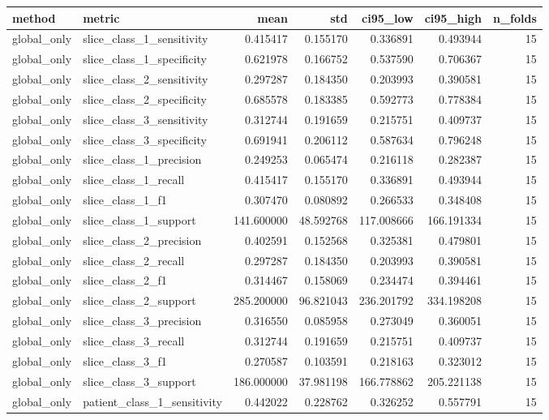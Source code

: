 \begin{tabular}{llrrrrr}
\toprule
method & metric & mean & std & ci95_low & ci95_high & n_folds \\
\midrule
global_only & slice_class_1_sensitivity & 0.415417 & 0.155170 & 0.336891 & 0.493944 & 15 \\
global_only & slice_class_1_specificity & 0.621978 & 0.166752 & 0.537590 & 0.706367 & 15 \\
global_only & slice_class_2_sensitivity & 0.297287 & 0.184350 & 0.203993 & 0.390581 & 15 \\
global_only & slice_class_2_specificity & 0.685578 & 0.183385 & 0.592773 & 0.778384 & 15 \\
global_only & slice_class_3_sensitivity & 0.312744 & 0.191659 & 0.215751 & 0.409737 & 15 \\
global_only & slice_class_3_specificity & 0.691941 & 0.206112 & 0.587634 & 0.796248 & 15 \\
global_only & slice_class_1_precision & 0.249253 & 0.065474 & 0.216118 & 0.282387 & 15 \\
global_only & slice_class_1_recall & 0.415417 & 0.155170 & 0.336891 & 0.493944 & 15 \\
global_only & slice_class_1_f1 & 0.307470 & 0.080892 & 0.266533 & 0.348408 & 15 \\
global_only & slice_class_1_support & 141.600000 & 48.592768 & 117.008666 & 166.191334 & 15 \\
global_only & slice_class_2_precision & 0.402591 & 0.152568 & 0.325381 & 0.479801 & 15 \\
global_only & slice_class_2_recall & 0.297287 & 0.184350 & 0.203993 & 0.390581 & 15 \\
global_only & slice_class_2_f1 & 0.314467 & 0.158069 & 0.234474 & 0.394461 & 15 \\
global_only & slice_class_2_support & 285.200000 & 96.821043 & 236.201792 & 334.198208 & 15 \\
global_only & slice_class_3_precision & 0.316550 & 0.085958 & 0.273049 & 0.360051 & 15 \\
global_only & slice_class_3_recall & 0.312744 & 0.191659 & 0.215751 & 0.409737 & 15 \\
global_only & slice_class_3_f1 & 0.270587 & 0.103591 & 0.218163 & 0.323012 & 15 \\
global_only & slice_class_3_support & 186.000000 & 37.981198 & 166.778862 & 205.221138 & 15 \\
global_only & patient_class_1_sensitivity & 0.442022 & 0.228762 & 0.326252 & 0.557791 & 15 \\

\end{tabular}
